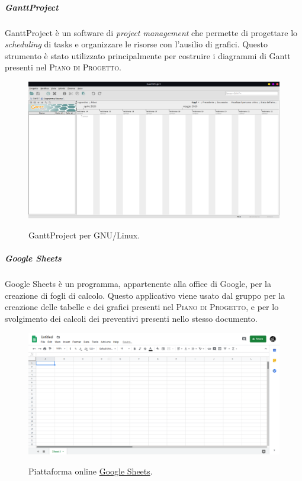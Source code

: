\documentclass[../norme-di-progetto.tex]{subfiles}
\begin{document}
\subparagraph{GanttProject}
GanttProject è un software di \textit{project management} che permette di progettare lo \textit{scheduling} di tasks e organizzare le risorse con l'ausilio di grafici. Questo strumento è stato utilizzato principalmente per costruire i diagrammi di Gantt presenti nel \textsc{Piano di Progetto}.

\begin{figure}[H]
  \centering
  \includegraphics[width=15cm]{img/gantt.png}
  \label{fig:gantt}
  \caption{GanttProject per GNU/Linux.}
\end{figure}

\subparagraph{Google Sheets}
Google Sheets è un programma, appartenente alla  office di Google, per la creazione di fogli di calcolo. Questo applicativo viene usato dal gruppo per la creazione delle tabelle e dei grafici presenti nel \textsc{Piano di Progetto}, e per lo svolgimento dei calcoli dei preventivi presenti nello stesso documento.

\begin{figure}[H]
  \centering
  \includegraphics[width=15cm]{img/sheets.png}
  \label{fig:sheets}
  \caption{Piattaforma online \href{https://docs.google.com/spreadsheets/u/0/}{Google Sheets}.}
\end{figure}
\end{document}
